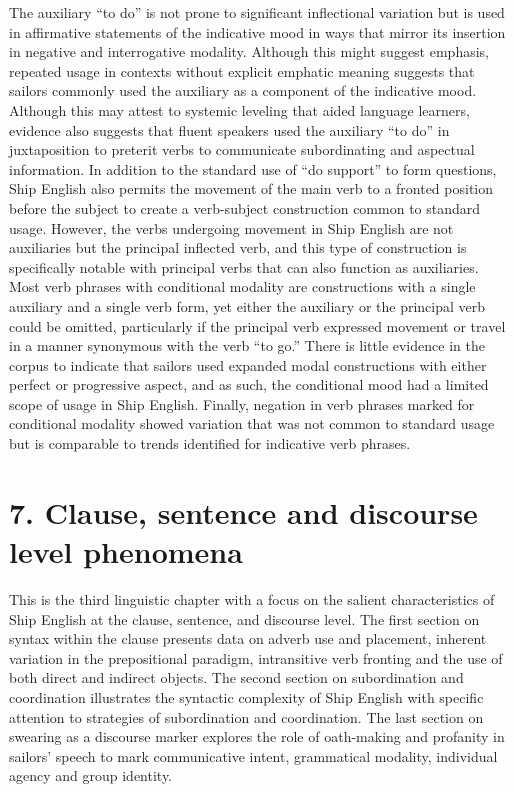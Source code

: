 The auxiliary “to do” is not prone to significant inflectional variation but is used in affirmative statements of the indicative mood in ways that mirror its insertion in negative and interrogative modality. Although this might suggest emphasis, repeated usage in contexts without explicit emphatic meaning suggests that sailors commonly used the auxiliary as a component of the indicative mood. Although this may attest to systemic leveling that aided language learners, evidence also suggests that fluent speakers used the auxiliary “to do” in juxtaposition to preterit verbs to communicate subordinating and aspectual information. In addition to the standard use of “do support” to form questions, Ship English also permits the movement of the main verb to a fronted position before the subject to create a verb-subject construction common to standard usage. However, the verbs undergoing movement in Ship English are not auxiliaries but the principal inflected verb, and this type of construction is specifically notable with principal verbs that can also function as auxiliaries. Most verb phrases with conditional modality are constructions with a single auxiliary and a single verb form, yet either the auxiliary or the principal verb could be omitted, particularly if the principal verb expressed movement or travel in a manner synonymous with the verb “to go.” There is little evidence in the corpus to indicate that sailors used expanded modal constructions with either perfect or progressive aspect, and as such, the conditional mood had a limited scope of usage in Ship English. Finally, negation in verb phrases marked for conditional modality showed variation that was not common to standard usage but is comparable to trends identified for indicative verb phrases. 

\chapter{\textbf{7.} {Clause,} {sentence} {and} {discourse} {level} {phenomena}}

This is the third linguistic chapter with a focus on the salient characteristics of Ship English at the clause, sentence, and discourse level. The first section on syntax within the clause presents data on adverb use and placement, inherent variation in the prepositional paradigm, intransitive verb fronting and the use of both direct and indirect objects. The second section on subordination and coordination illustrates the syntactic complexity of Ship English with specific attention to strategies of subordination and coordination. The last section on swearing as a discourse marker explores the role of oath-making and profanity in sailors’ speech to mark communicative intent, grammatical modality, individual agency and group identity. 

